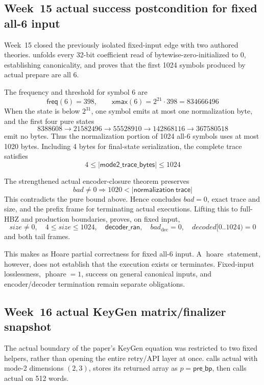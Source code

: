 \subsection{Week~15 actual success postcondition for fixed all-6 input}

Week~15 closed the previously isolated fixed-input edge with two authored
theories. \allowbreak{}
unfolds every 32-bit coefficient read of bytewise-zero-initialized
 to 0, establishing canonicality, and proves that the
first 1024 symbols produced by actual prepare are all 6.

The frequency and threshold for symbol 6 are
\[
  \mathsf{freq}(6)=398,\qquad
  \mathsf{xmax}(6)=2^{21}\cdot398=834666496
\]
When the state is below \(2^{31}\), one symbol emits at most one
normalization byte, and the first four pure states
\[
8388608\to21582496\to55528910\to142868116\to367580518
\]
emit no bytes. Thus the normalization portion of 1024 all-6 symbols uses at
most 1020 bytes. Including 4 bytes for final-state serialization, the complete trace satisfies
\[
  4\le |\mathsf{mode2\_trace\_bytes}|\le1024
\]

The strengthened actual encoder-closure theorem preserves
\[
  bad\ne0\Longrightarrow
  1020<|\mathsf{normalization\ trace}|
\]
This contradicts the pure bound above. Hence
 concludes \(bad=0\), exact trace
and size, and the prefix frame for terminating actual 
executions. Lifting this to full-HBZ and production boundaries,
 proves, on fixed
 input,
\[
  size\ne0,\quad 4\le size\le1024,\quad
  \mathsf{decoder\_ran},\quad bad_{\mathrm{dec}}=0,\quad
  decoded[0..1024)=0
\]
and both tail frames.

This makes  \statusproved as Hoare
partial correctness for fixed all-6 input. A \(\operatorname{hoare}\) statement,
however, does not establish that the execution exists or terminates. Fixed-input
losslessness, \(\operatorname{phoare}=1\), success on general canonical inputs,
and encoder/decoder termination remain separate obligations.

\subsection{Week~16 actual KeyGen matrix/finalizer snapshot}

The actual boundary of the paper's KeyGen equation was restricted to two
fixed helpers, rather than opening the entire retry/API layer at once.
 calls actual
 with mode-2 dimensions \((2,3)\), stores its returned
array as \(p=\mathsf{pre\_bp}\), then calls actual
 on 512 words.

